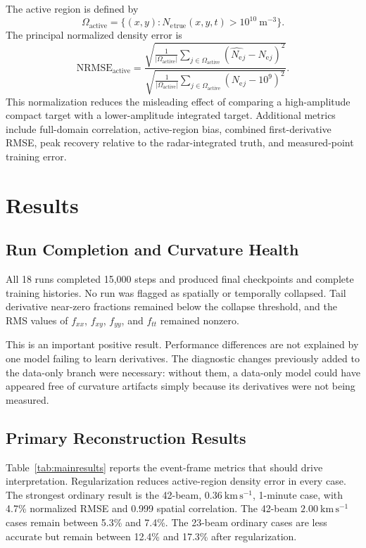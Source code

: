 \documentclass[11pt]{article}
\newcommand{\Ne}{N_{\mathrm e}}
\newcommand{\nrmse}{\mathrm{NRMSE}}
\newcommand{\kmps}{\mathrm{km\,s^{-1}}}
\begin{document}
The active region is defined by
\begin{equation}
  \Omega_{\mathrm{active}} = \{(x,y):\Ne{}_{\mathrm{true}}(x,y,t)>10^{10}~\mathrm{m^{-3}}\}.
\end{equation}
The principal normalized density error is
\begin{equation}
  \nrmse_{\mathrm{active}} =
  \frac{
  \sqrt{\frac{1}{|\Omega_{\mathrm{active}}|}
  \sum_{j\in\Omega_{\mathrm{active}}}(\widehat{\Ne}{}_j-\Ne{}_j)^2}}
  {\sqrt{\frac{1}{|\Omega_{\mathrm{active}}|}
  \sum_{j\in\Omega_{\mathrm{active}}}(\Ne{}_j-10^9)^2}}.
  \label{eq:nrmse}
\end{equation}
This normalization reduces the misleading effect of comparing a high-amplitude compact target with a
lower-amplitude integrated target. Additional metrics include full-domain correlation, active-region bias,
combined first-derivative RMSE, peak recovery relative to the radar-integrated truth, and measured-point
training error.

\section{Results}

\subsection{Run Completion and Curvature Health}

All 18 runs completed 15,000 steps and produced final checkpoints and complete training histories. No run
was flagged as spatially or temporally collapsed. Tail derivative near-zero fractions remained below the
collapse threshold, and the RMS values of $f_{xx}$, $f_{xy}$, $f_{yy}$, and $f_{tt}$ remained nonzero.

This is an important positive result. Performance differences are not explained by one model failing to
learn derivatives. The diagnostic changes previously added to the data-only branch were necessary: without
them, a data-only model could have appeared free of curvature artifacts simply because its derivatives were
not being measured.

\subsection{Primary Reconstruction Results}

Table~\ref{tab:mainresults} reports the event-frame metrics that should drive interpretation. Regularization
reduces active-region density error in every case. The strongest ordinary result is the 42-beam,
$0.36~\kmps$, 1-minute case, with 4.7\% normalized RMSE and 0.999 spatial correlation. The 42-beam
$2.00~\kmps$ cases remain between 5.3\% and 7.4\%. The 23-beam ordinary cases are less accurate but remain
between 12.4\% and 17.3\% after regularization.
\end{document}
